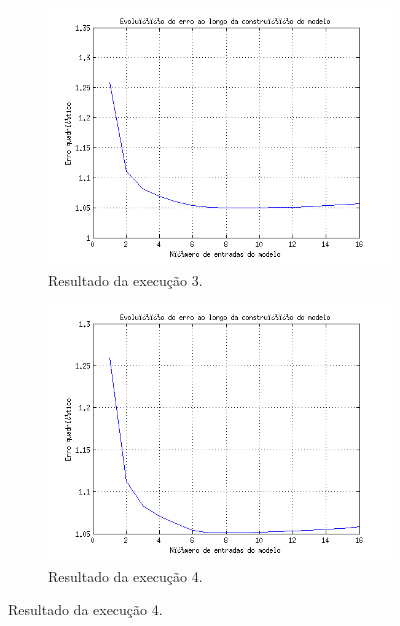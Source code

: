 \begin{figure}[H]
			\begin{subfigure}{.5\textwidth}
				  \centering
				  \includegraphics[width=1\linewidth]{image/forward3_2}
				  \caption{Resultado da execução 3.}
				  \label{forward3_2}
				\end{subfigure}%
				\begin{subfigure}{.5\textwidth}
				  \centering
				  \includegraphics[width=1\linewidth]{image/forward4_2}
				  \caption{Resultado da execução 4.}
				  \label{forward4_2}
				\end{subfigure}			
			

\end{figure}
